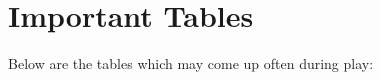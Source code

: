 \appendix
\chapter{Important Tables}
\label{ap:important-tables}
\label{critical-hits}
Below are the tables which may come up often during play:
\label{critical-hits-artillery}



